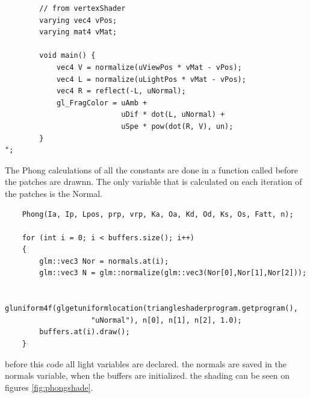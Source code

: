 \documentclass{article}
\begin{document}
\begin{verbatim}
        // from vertexShader															  
        varying vec4 vPos;                                                                
        varying mat4 vMat;                                                                
                                                                                          
        void main()	{																	  
            vec4 V = normalize(uViewPos * vMat - vPos);                                   
            vec4 L = normalize(uLightPos * vMat - vPos);                                  
            vec4 R = reflect(-L, uNormal);                                                
            gl_FragColor = uAmb + 
                           uDif * dot(L, uNormal) + 
                           uSpe * pow(dot(R, V), un);     
        }																				  
";
\end{verbatim}
The Phong calculations of all the constants are done in a function called before the patches are drawnn.
The only variable that is calculated on each iteration of the patches is the Normal.
\begin{verbatim}
    Phong(Ia, Ip, Lpos, prp, vrp, Ka, Oa, Kd, Od, Ks, Os, Fatt, n);

    for (int i = 0; i < buffers.size(); i++)
    {
        glm::vec3 Nor = normals.at(i);
        glm::vec3 N = glm::normalize(glm::vec3(Nor[0],Nor[1],Nor[2]));

        gluniform4f(glgetuniformlocation(triangleshaderprogram.getprogram(), 
                    "uNormal"), n[0], n[1], n[2], 1.0);
        buffers.at(i).draw();
    }
\end{verbatim}
before this code all light variables are declared. the normals are saved in the normals variable, when the buffers are initialized.
the shading can be seen on figures \ref{fig:phongshade}.  
\end{document}
